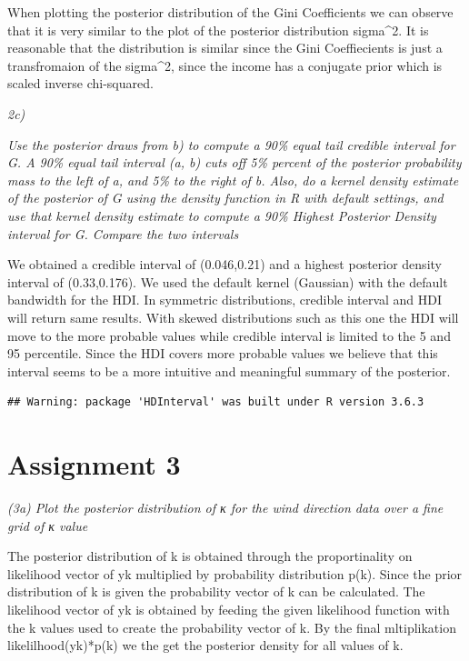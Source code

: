 \documentclass[]{article}
\begin{document}
When plotting the posterior distribution of the Gini Coefficients we can
observe that it is very similar to the plot of the posterior
distribution sigma\^{}2. It is reasonable that the distribution is
similar since the Gini Coeffiecients is just a transfromaion of the
sigma\^{}2, since the income has a conjugate prior which is scaled
inverse chi-squared.

\emph{2c)}

\emph{Use the posterior draws from b) to compute a 90\% equal tail
credible interval for G. A 90\% equal tail interval (a, b) cuts off 5\%
percent of the posterior probability mass to the left of a, and 5\% to
the right of b. Also, do a kernel density estimate of the posterior of G
using the density function in R with default settings, and use that
kernel density estimate to compute a 90\% Highest Posterior Density
interval for G. Compare the two intervals}

We obtained a credible interval of (0.046,0.21) and a highest posterior
density interval of (0.33,0.176). We used the default kernel (Gaussian)
with the default bandwidth for the HDI. In symmetric distributions,
credible interval and HDI will return same results. With skewed
distributions such as this one the HDI will move to the more probable
values while credible interval is limited to the 5 and 95 percentile.
Since the HDI covers more probable values we believe that this interval
seems to be a more intuitive and meaningful summary of the posterior.

\begin{verbatim}
## Warning: package 'HDInterval' was built under R version 3.6.3
\end{verbatim}

\hypertarget{assignment-3}{%
\section{Assignment 3}\label{assignment-3}}

\emph{(3a) Plot the posterior distribution of κ for the wind direction
data over a fine grid of κ value}

The posterior distribution of k is obtained through the proportinality
on likelihood vector of y\textbar k multiplied by probability
distribution p(k). Since the prior distribution of k is given the
probability vector of k can be calculated. The likelihood vector of
y\textbar k is obtained by feeding the given likelihood function with
the k values used to create the probability vector of k. By the final
mltiplikation likelilhood(y\textbar k)*p(k) we the get the posterior
density for all values of k.
\end{document}

